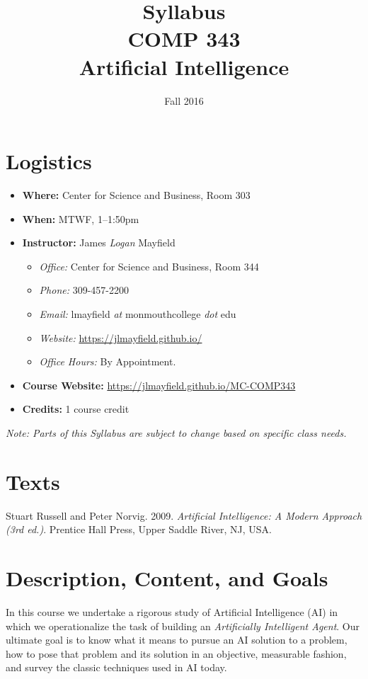 \documentclass[10pt]{article}
\title{Syllabus \\ COMP 343 \\ Artificial Intelligence}
\author{  }
\date{Fall 2016}
\begin{document}
\maketitle

\section{Logistics}
\begin{itemize}
\item \textbf{Where: } Center for Science and Business, Room 303
\item \textbf{When: } MTWF,  1--1:50pm
\item \textbf{Instructor:} James \textit{Logan} Mayfield
\begin{itemize}
\item \textit{Office: } Center for Science and Business, Room 344
\item \textit{Phone: } 309-457-2200 %
\item \textit{Email: } lmayfield \textit{at} monmouthcollege \textit{dot} edu
\item \textit{Website: } \url{https://jlmayfield.github.io/}
\item \textit{Office Hours: } By Appointment.
\end{itemize}
\item \textbf{Course Website: } \url{https://jlmayfield.github.io/MC-COMP343}
\item \textbf{Credits: } 1 course credit
\end{itemize}
\emph{Note: Parts of this Syllabus are subject to change based on specific class needs.}

\section{Texts}

\noindent Stuart Russell and Peter Norvig. 2009. \textit{Artificial Intelligence: A Modern Approach (3rd ed.)}. Prentice Hall Press, Upper Saddle River, NJ, USA\@.

\section{Description, Content, and Goals}

In this course we undertake a rigorous study of Artificial Intelligence (AI) in which we
operationalize the task of building an \textit{Artificially Intelligent Agent}. Our
ultimate goal is to know what it means to pursue an AI solution to a problem, how
to pose that problem and its solution in an objective, measurable fashion, and
survey the classic techniques used in AI today.
\end{document}
